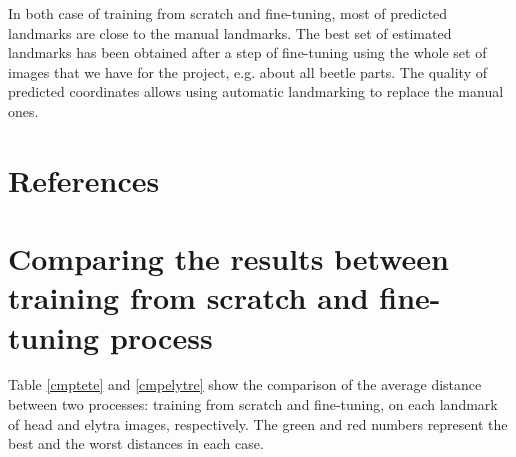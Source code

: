 \documentclass[review]{elsarticle}
\begin{document}
In both case of training from scratch and fine-tuning, most of predicted landmarks are close to the manual landmarks. The best set of estimated landmarks has been obtained after a step of fine-tuning using the whole set of images that we have for the
project, e.g. about all beetle parts. The quality of predicted coordinates allows using automatic landmarking to replace the manual ones.

\section*{References}



\pagebreak
\appendix
\section{Comparing the results between training from scratch and fine-tuning process}
\label{appdixA1}
Table \ref{cmptete} and \ref{cmpelytre} show the comparison of the average distance between two processes: training from scratch and fine-tuning, on each landmark of head and elytra images, respectively. The green and red numbers represent the best and the worst distances in each case.
\end{document}
